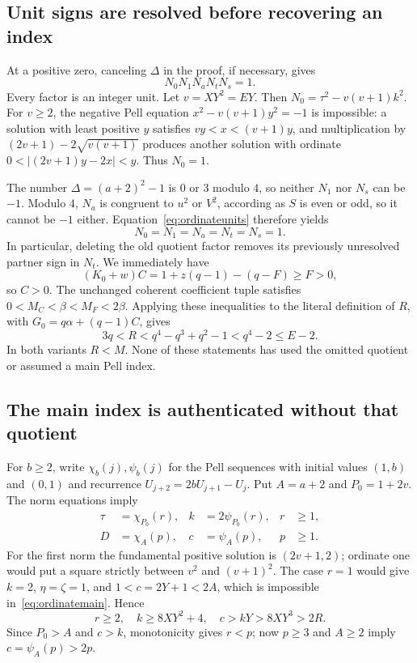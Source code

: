 \subsection{Unit signs are resolved before recovering an index}

At a positive zero, canceling $\Delta$ in the proof, if necessary, gives
\begin{equation}\label{eq:ordinateunits}
 N_0N_1N_aN_tN_s=1.
\end{equation}
Every factor is an integer unit. Let $v=XY^2=EY$. Then
$N_0=\tau^2-v(v+1)k^2$. For $v\ge2$, the negative Pell equation
$x^2-v(v+1)y^2=-1$ is impossible: a solution with least positive $y$
satisfies $vy<x<(v+1)y$, and multiplication by
$(2v+1)-2\sqrt{v(v+1)}$ produces another solution with ordinate
$0<|(2v+1)y-2x|<y$. Thus $N_0=1$.

The number $\Delta=(a+2)^2-1$ is $0$ or $3$ modulo $4$, so neither
$N_1$ nor $N_s$ can be $-1$. Modulo $4$, $N_a$ is congruent to $u^2$
or $V^2$, according as $S$ is even or odd, so it cannot be $-1$ either.
Equation~\eqref{eq:ordinateunits} therefore yields
\begin{equation}\label{eq:ordinateallunits}
 N_0=N_1=N_a=N_t=N_s=1.
\end{equation}
In particular, deleting the old quotient factor removes its previously
unresolved partner sign in $N_t$. We immediately have
\[
 (K_0+w)C=1+z(q-1)-(q-F)\ge F>0,
\]
so $C>0$. The unchanged coherent coefficient tuple satisfies
$0<M_C<\beta<M_F<2\beta$. Applying these inequalities to the literal
definition of $R$, with
$G_0=q\alpha+(q-1)C$, gives
\begin{equation}\label{eq:ordinatemask}
 3q<R<q^4-q^3+q^2-1<q^4-2\le E-2.
\end{equation}
In both variants $R<M$. None of these statements has used the omitted
quotient or assumed a main Pell index.

\subsection{The main index is authenticated without that quotient}

For $b\ge2$, write $\chi_b(j),\psi_b(j)$ for the Pell sequences with
initial values $(1,b)$ and $(0,1)$ and recurrence
$U_{j+2}=2bU_{j+1}-U_j$. Put $A=a+2$ and $P_0=1+2v$.
The norm equations imply
\begin{align}
 \tau&=\chi_{P_0}(r),&k&=2\psi_{P_0}(r),&r&\ge1,
     \label{eq:ordinatefirst}\\
 D&=\chi_A(p),&c&=\psi_A(p),&p&\ge1.
     \label{eq:ordinatemain}
\end{align}
For the first norm the fundamental positive solution is $(2v+1,2)$;
ordinate one would put a square strictly between $v^2$ and $(v+1)^2$.
The case $r=1$ would give $k=2$, $\eta=\zeta=1$, and
$1<c=2Y+1<2A$, which is impossible in~\eqref{eq:ordinatemain}.
Hence
\begin{equation}\label{eq:ordinategrowth}
 r\ge2,\quad k\ge8XY^2+4,\quad c>kY>8XY^3>2R.
\end{equation}
Since $P_0>A$ and $c>k$, monotonicity gives $r<p$; now $p\ge3$ and
$A\ge2$ imply $c=\psi_A(p)>2p$.

